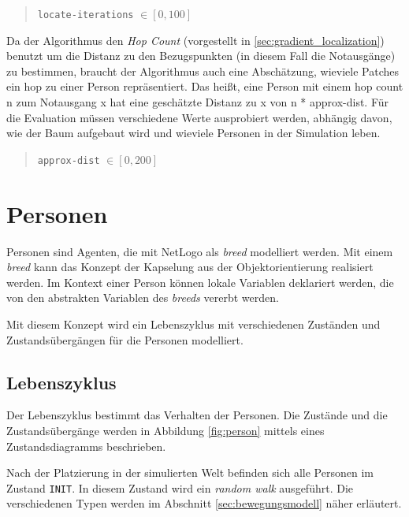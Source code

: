 \begin{quote}
\verb|locate-iterations| $\in [0, 100]$
\end{quote}

Da der Algorithmus den \emph{Hop Count} (vorgestellt in \ref{sec:gradient_localization}) benutzt um die Distanz zu den Bezugspunkten (in diesem Fall die Notausgänge) zu bestimmen, braucht der Algorithmus auch eine Abschätzung, wieviele Patches ein hop zu einer Person repräsentiert. Das heißt, eine Person mit einem hop count n zum Notausgang x hat eine geschätzte Distanz zu x von n * approx-dist. Für die Evaluation müssen verschiedene Werte ausprobiert werden, abhängig davon, wie der Baum aufgebaut wird und wieviele Personen in der Simulation leben.

\begin{quote}
\verb|approx-dist| $\in [0, 200]$
\end{quote}






\section{Personen}
\label{sec:personen}

Personen sind Agenten, die mit NetLogo als \emph{breed} modelliert werden. Mit einem \emph{breed} kann das Konzept der Kapselung aus der Objektorientierung realisiert werden. Im Kontext einer Person können lokale Variablen deklariert werden, die von den abstrakten Variablen des \emph{breeds} vererbt werden. 

Mit diesem Konzept wird ein Lebenszyklus mit verschiedenen Zuständen und Zustandsübergängen für die Personen modelliert. 

\subsection{Lebenszyklus}

Der Lebenszyklus bestimmt das Verhalten der Personen. Die Zustände und die Zustandsübergänge werden in Abbildung \ref{fig:person} mittels eines Zustandsdiagramms beschrieben. 

Nach der Platzierung in der simulierten Welt befinden sich alle Personen im Zustand \verb|INIT|. In diesem Zustand wird ein \emph{random walk} ausgeführt. Die verschiedenen Typen werden im Abschnitt \ref{sec:bewegungsmodell} näher erläutert.

